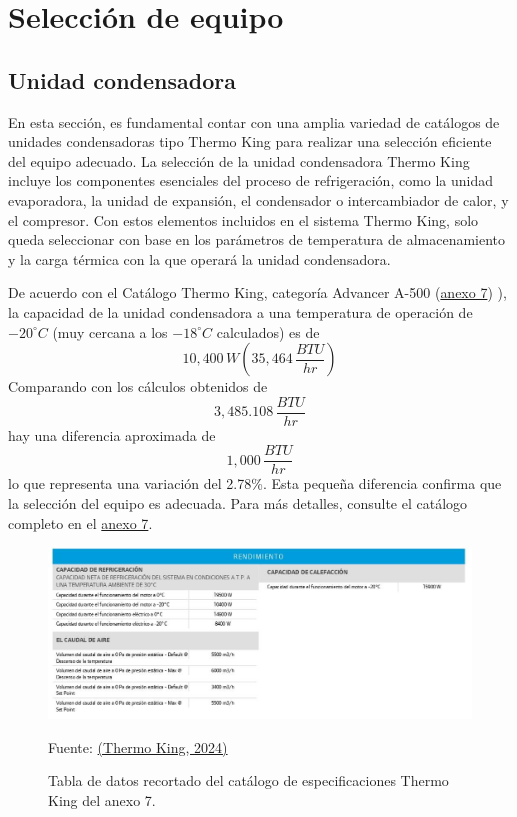  \section{Selección de equipo}	

 
 \subsection{Unidad condensadora}
 
 En esta sección, es fundamental contar con una amplia variedad de catálogos de unidades condensadoras tipo Thermo King para realizar una selección eficiente del equipo adecuado. La selección de la unidad condensadora Thermo King incluye los componentes esenciales del proceso de refrigeración, como la unidad evaporadora, la unidad de expansión, el condensador o intercambiador de calor, y el compresor. Con estos elementos incluidos en el sistema Thermo King, solo queda seleccionar con base en los parámetros de temperatura de almacenamiento y la carga térmica con la que operará la unidad condensadora.
 
 De acuerdo con el Catálogo Thermo King, categoría Advancer A-500 (\hyperref[fig:axo-manual-thermo-king]{anexo 7}) ), la capacidad de la unidad condensadora a una temperatura de operación de $-20^\circ C$ (muy cercana a los $-18^\circ C$ calculados) es de 
 \[
 10,400\, W \left( 35,464\, \frac{BTU}{hr} \right)
 \]
 Comparando con los cálculos obtenidos de 
 \[
	3,485.108 \, \frac{BTU}{hr}
 \]
 hay una diferencia aproximada de 
 \[
 1,000\, \frac{BTU}{hr}
 \]
 lo que representa una variación del 2.78\%. Esta pequeña diferencia confirma que la selección del equipo es adecuada. Para más detalles, consulte el catálogo completo en el \hyperref[fig:axo-manual-thermo-king]{anexo 7}.
 
 \begin{figure}[H]
 	\centering
 	\includegraphics[width=0.8\linewidth]{figures/4-seleccion-condensador}
 	\caption{Tabla de datos recortado del catálogo de especificaciones Thermo King del anexo 7.}
 	Fuente: \hyperref[fig:axo-manual-thermo-king]{(Thermo King, 2024)}
 	\label{fig:4-seleccion-condensador}
 \end{figure}
 
